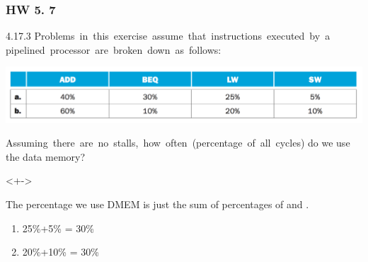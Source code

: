 \documentclass[xcolor=table]{beamer}
\begin{document}
\begin{mdframe}%

\frametitle{HW 5. 7}\label{heading-sec-hw-5-7}%

\noindent{}4.17.3 Problems  in  this  exercise  assume  that  instructions  executed  by  a  pipelined  processor  are  broken  down  as  follows:%

\begin{mdcenter}%

\noindent{}\includegraphics[keepaspectratio=true,width=\dimmin{}{\dimwidth{1.00}}]{images/Screen-Shot-2018-10-27-at-9.15.17-PM}{}%
\end{mdcenter}%

\noindent{}Assuming  there  are  no  stalls,  how  often  (percentage  of  all  cycles) do we use the data memory?%

\mdhr{}%

\begin{onlyenv}<+->%

\noindent{}The percentage we use DMEM is just the sum of percentages of  and .%

\begin{enumerate}[noitemsep,topsep=\mdcompacttopsep,label=\alph*.]%

\item{}25\%+5\%  = 30\%%

\item{}20\%+10\% = 30\%%
\end{enumerate}%
\end{onlyenv}%
\end{mdframe}\label{sec-hw-5-7}%
\end{document}
